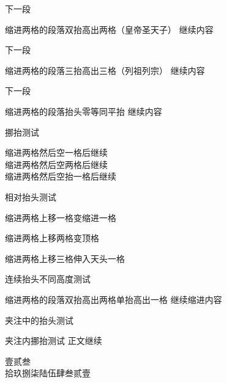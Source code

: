 \documentclass{ltc-guji}
\begin{document}
\begin{正文}
下一段

\begin{段落}[indent=2]
缩进两格的段落 双抬高出两格（皇帝圣天子）
继续内容
\end{段落}

下一段

\begin{段落}[indent=2]
缩进两格的段落 三抬高出三格（列祖列宗）
继续内容
\end{段落}

下一段

\begin{段落}[indent=2]
缩进两格的段落 抬头零等同平抬
继续内容
\end{段落}

挪抬测试

\begin{段落}[indent=2]
缩进两格然后 空一格后继续\\
缩进两格然后 空两格后继续\\
缩进两格然后 空抬一格后继续
\end{段落}

相对抬头测试

\begin{段落}[indent=2]
缩进两格 上移一格变缩进一格
\end{段落}

\begin{段落}[indent=2]
缩进两格 上移两格变顶格
\end{段落}

\begin{段落}[indent=2]
缩进两格 上移三格伸入天头一格
\end{段落}

连续抬头不同高度测试

\begin{段落}[indent=2]
缩进两格的段落 双抬高出两格 单抬高出一格
继续缩进内容
\end{段落}

夹注中的抬头测试

\begin{段落}[indent=2]
\end{段落}

\begin{段落}[indent=2]
夹注内挪抬测试
正文继续
\end{段落}

壹贰叁\\
拾玖捌柒陆伍肆叁贰壹\\


\end{正文}
\end{document}

